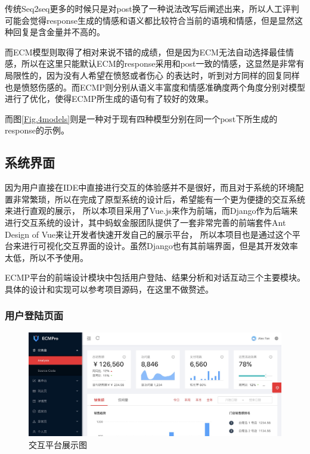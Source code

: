 \documentclass[supercite]{HustGraduPaper}
\theoremstyle{definition}
\begin{document}
传统Seq2seq更多的时候只是对post换了一种说法改写后阐述出来，所以人工评判可能会觉得response生成的情感和语义都比较符合当前的语境和情感，但是显然这种回复是含金量并不高的。

而ECM模型则取得了相对来说不错的成绩，但是因为ECM无法自动选择最佳情感，所以在这里只能默认ECM的response采用和post一致的情感，这显然是非常有局限性的，因为没有人希望在愤怒或者伤心
的表达时，听到对方同样的回复同样也是愤怒伤感的。而ECMP则分别从语义丰富度和情感准确度两个角度分别对模型进行了优化，使得ECMP所生成的语句有了较好的效果。

而图\ref{Fig.4models}则是一种对于现有四种模型分别在同一个post下所生成的response的示例。

\subsection{系统界面}
因为用户直接在IDE中直接进行交互的体验感并不是很好，而且对于系统的环境配置非常繁琐，所以在完成了原型系统的设计后，希望能有一个更为便捷的交互系统来进行直观的展示，
所以本项目采用了Vue.js来作为前端，而Django作为后端来进行交互系统的设计，其中蚂蚁金服团队提供了一套非常完善的前端套件Ant Design of Vue来让开发者快速开发自己的展示平台，
所以本项目也是通过这个平台来进行可视化交互界面的设计。虽然Django也有其前端界面，但是其开发效率太低，所以不予使用。

ECMP平台的前端设计模块中包括用户登陆、结果分析和对话互动三个主要模块。具体的设计和实现可以参考项目源码\cite{ECMP}，在这里不做赘述。
\subsubsection{用户登陆页面}
\begin{figure}[H] %
  \centering %
  \includegraphics[width=1\textwidth]{images/show.png} %
  \caption{交互平台展示图} %
  \label{Fig.show} %
\end{figure}
\end{document}
